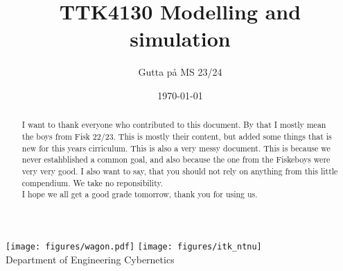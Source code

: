 \documentclass[11pt, a4paper, USenglish]{article} %
\begin{document}
\title{TTK4130 Modelling and simulation}
\author{Gutta på MS 23/24}
\date{\today}
\begin{titlepage}
    \maketitle
    \begin{center}
    \texttt{[image: figures/wagon.pdf]}
    \vfill %
    \texttt{[image: figures/itk\_ntnu]}\\
    Department of Engineering Cybernetics
    \end{center}
    \thispagestyle{empty}
\end{titlepage}

\newpage
\thispagestyle{empty}
\vspace*{\fill}
\begin{abstract}
    \centering
    I want to thank everyone who contributed to this document. By that I mostly mean the boys from Fisk 22/23. This is mostly their content, but added some things that is new for this years cirriculum. This is also a very messy document. This is because we never estahblished a common goal, and also because the one from the Fiskeboys were very very good. I also want to say, that you should not rely on anything from this little compendium. We take no reponsibility. \\
    I hope we all get a good grade tomorrow, thank you for using us.
\end{abstract}
\vspace*{\fill}

\newpage
\tableofcontents
\thispagestyle{empty} %


\newpage
\setcounter{page}{1}
















%
%
\end{document}
